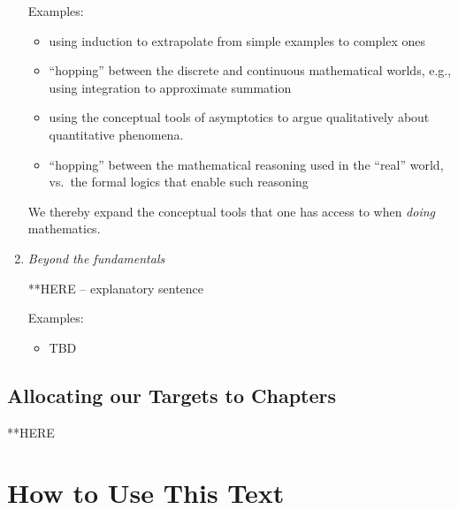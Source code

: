 \begin{enumerate}
\medskip

{\small\sf Examples:}
\begin{itemize}
\item
using induction to extrapolate from simple examples to complex ones
\item
``hopping'' between the discrete and continuous mathematical worlds,
e.g., using integration to approximate summation
\item
using the conceptual tools of asymptotics to argue qualitatively about
quantitative phenomena.
\item
``hopping'' between the mathematical reasoning used in the ``real''
  world, vs.~the formal logics that enable such reasoning
\end{itemize}
We thereby expand the conceptual tools that one has access to when
{\em doing} mathematics.

\medskip

\item
{\it Beyond the fundamentals}

**HERE -- explanatory sentence

\medskip

{\small\sf Examples:}
\begin{itemize}
\item
TBD
\end{itemize}

\end{enumerate}


\subsection{Allocating our Targets to Chapters}
\label{sec:the chapters}

**HERE



\section{How to Use This Text}
\label{sec:how-to-use}




